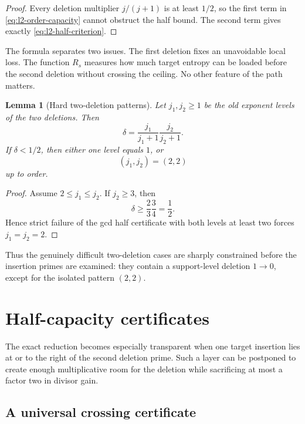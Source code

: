 \documentclass[11pt]{article}
\numberwithin{equation}{section}
\theoremstyle{blueplain}
\newtheorem{lemma}[theorem]{Lemma}
\theoremstyle{bluedef}
\begin{document}
\begin{proof}
Every deletion multiplier $j/(j+1)$ is at least $1/2$, so the first term in \eqref{eq:l2-order-capacity} cannot obstruct the half bound.  The second term gives exactly \eqref{eq:l2-half-criterion}.
\end{proof}

The formula separates two issues.  The first deletion fixes an unavoidable local loss.  The function $R_s$ measures how much target entropy can be loaded before the second deletion without crossing the ceiling.  No other feature of the path matters.

\begin{lemma}[Hard two-deletion patterns]
\label{lem:hard-l2-patterns}
Let $j_1,j_2\ge1$ be the old exponent levels of the two deletions.  Then
\begin{equation}
 \delta=\frac{j_1}{j_1+1}\frac{j_2}{j_2+1}.
 \label{eq:l2-delta-levels}
\end{equation}
If $\delta<1/2$, then either one level equals $1$, or
\begin{equation}
 (j_1,j_2)=(2,2)
 \label{eq:hard-22}
\end{equation}
up to order.
\end{lemma}

\begin{proof}
Assume $2\le j_1\le j_2$.  If $j_2\ge3$, then
\[
 \delta\ge\frac23\frac34=\frac12.
\]
Hence strict failure of the gcd half certificate with both levels at least two forces $j_1=j_2=2$.
\end{proof}

Thus the genuinely difficult two-deletion cases are sharply constrained before the insertion primes are examined: they contain a support-level deletion $1\to0$, except for the isolated pattern $(2,2)$.

\section{Half-capacity certificates}
\label{sec:half-certificates}

The exact reduction becomes especially transparent when one target insertion lies at or to the right of the second deletion prime.  Such a layer can be postponed to create enough multiplicative room for the deletion while sacrificing at most a factor two in divisor gain.

\subsection{A universal crossing certificate}
\end{document}
